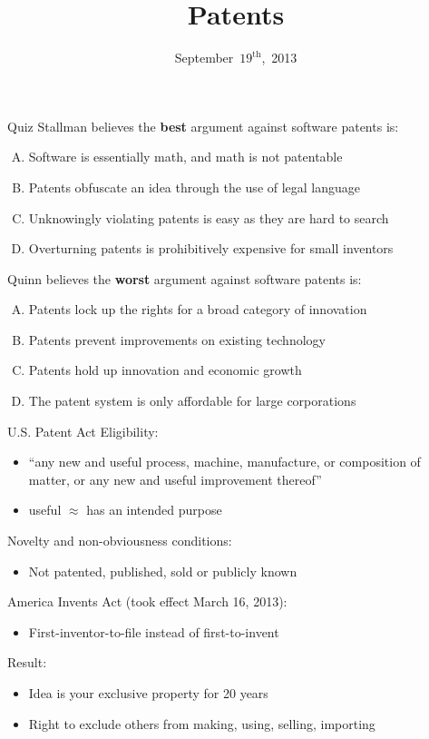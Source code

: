\documentclass{beamer}
\title{Patents}
\date{September~$19^{\text{th}}$,~2013}
\begin{document}
\begin{frame}
\titlepage
\end{frame}

\begin{frame}{Quiz}
Stallman believes the \textbf{best} argument against software patents is:
\begin{enumerate}[(A)]
\item<1-2> Software is essentially math, and math is not patentable
\item<1> Patents obfuscate an idea through the use of legal language
\item<1> Unknowingly violating patents is easy as they are hard to search
\item<1> Overturning patents is prohibitively expensive for small inventors
\end{enumerate}
\bigskip
Quinn believes the \textbf{worst} argument against software patents is:
\begin{enumerate}[(A)]
\item<1-2> Patents lock up the rights for a broad category of innovation
\item<1> Patents prevent improvements on existing technology
\item<1> Patents hold up innovation and economic growth
\item<1> The patent system is only affordable for large corporations
\end{enumerate}
\end{frame}

\begin{frame}{U.S. Patent Act}
Eligibility:
\begin{itemize}
\item ``any new and useful process, machine, manufacture, or composition of matter, or any new and useful improvement thereof''
\item useful $\approx$ has an intended purpose
\end{itemize}
Novelty and non-obviousness conditions:
\begin{itemize}
\item Not patented, published, sold or publicly known
\end{itemize}
America Invents Act (took effect March 16, 2013):
\begin{itemize}
\item First-inventor-to-file instead of first-to-invent
\end{itemize}
\bigskip
Result:
\begin{itemize}
\item Idea is your exclusive property for 20 years
\item Right to exclude others from making, using, selling, importing
\end{itemize}
\end{frame}
\end{document}
